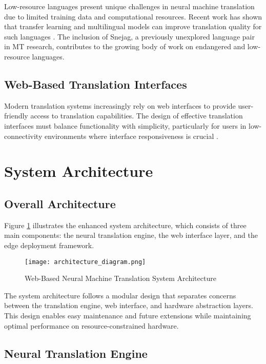\documentclass[conference]{IEEEtran}
\begin{document}
Low-resource languages present unique challenges in neural machine translation due to limited training data and computational resources. Recent work has shown that transfer learning and multilingual models can improve translation quality for such languages \cite{low-resource-mt}. The inclusion of Snejag, a previously unexplored language pair in MT research, contributes to the growing body of work on endangered and low-resource languages.

\subsection{Web-Based Translation Interfaces}

Modern translation systems increasingly rely on web interfaces to provide user-friendly access to translation capabilities. The design of effective translation interfaces must balance functionality with simplicity, particularly for users in low-connectivity environments where interface responsiveness is crucial \cite{web-translation-interfaces}.

\section{System Architecture}

\subsection{Overall Architecture}

Figure \ref{fig:architecture} illustrates the enhanced system architecture, which consists of three main components: the neural translation engine, the web interface layer, and the edge deployment framework.

\begin{figure}[htbp]
\centering
\texttt{[image: architecture\_diagram.png]}
\caption{Web-Based Neural Machine Translation System Architecture}
\label{fig:architecture}
\end{figure}

The system architecture follows a modular design that separates concerns between the translation engine, web interface, and hardware abstraction layers. This design enables easy maintenance and future extensions while maintaining optimal performance on resource-constrained hardware.

\subsection{Neural Translation Engine}
\end{document}
